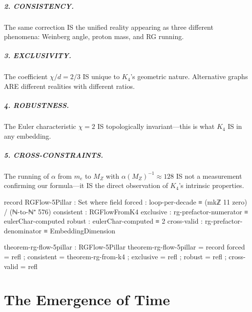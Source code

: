 \documentclass[11pt,a4paper]{book}
\begin{document}
\paragraph{2. CONSISTENCY.} The same correction IS the unified reality appearing as three different phenomena: Weinberg angle, proton mass, and RG running.

\paragraph{3. EXCLUSIVITY.} The coefficient $\chi/d = 2/3$ IS unique to $K_4$'s geometric nature. Alternative graphs ARE different realities with different ratios.

\paragraph{4. ROBUSTNESS.} The Euler characteristic $\chi = 2$ IS topologically invariant---this is what $K_4$ IS in any embedding.

\paragraph{5. CROSS-CONSTRAINTS.} The running of $\alpha$ from $m_e$ to $M_Z$ with $\alpha(M_Z)^{-1} \approx 128$ IS not a measurement confirming our formula---it IS the direct observation of $K_4$'s intrinsic properties.

\begin{code}
record RGFlow-5Pillar : Set where
  field
    forced       : loop-per-decade ≡ (mkℤ 11 zero) / (ℕ-to-ℕ⁺ 576)
    consistent   : RGFlowFromK4
    exclusive    : rg-prefactor-numerator ≡ eulerChar-computed
    robust       : eulerChar-computed ≡ 2
    cross-valid  : rg-prefactor-denominator ≡ EmbeddingDimension

theorem-rg-flow-5pillar : RGFlow-5Pillar
theorem-rg-flow-5pillar = record
  { forced      = refl
  ; consistent  = theorem-rg-from-k4
  ; exclusive   = refl
  ; robust      = refl
  ; cross-valid = refl
  }
\end{code}


\chapter{The Emergence of Time}
\label{chap:emergence-time}
\end{document}

